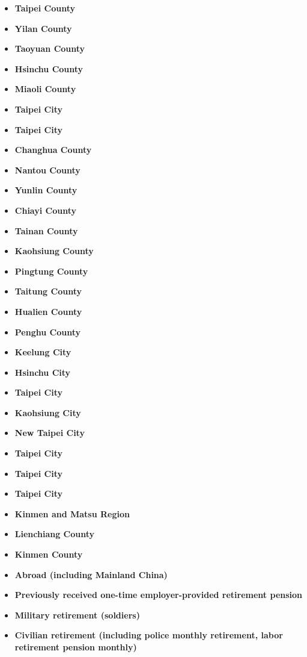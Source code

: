 \documentclass[twocolumn]{article}
\begin{document}
\begin{itemize}
    \item \textbf{Taipei County}
    \item \textbf{Yilan County}
    \item \textbf{Taoyuan County}
    \item \textbf{Hsinchu County}
    \item \textbf{Miaoli County}
    \item \textbf{Taipei City}
    \item \textbf{Taipei City}
    \item \textbf{Changhua County}
    \item \textbf{Nantou County}
    \item \textbf{Yunlin County}
    \item \textbf{Chiayi County}
    \item \textbf{Tainan County}
    \item \textbf{Kaohsiung County}
    \item \textbf{Pingtung County}
    \item \textbf{Taitung County}
    \item \textbf{Hualien County}
    \item \textbf{Penghu County}
    \item \textbf{Keelung City}
    \item \textbf{Hsinchu City}
    \item \textbf{Taipei City}
    \item \textbf{Kaohsiung City}
    \item \textbf{New Taipei City}
    \item \textbf{Taipei City}
    \item \textbf{Taipei City}
    \item \textbf{Taipei City}
    \item \textbf{Kinmen and Matsu Region}
    \item \textbf{Lienchiang County}
    \item \textbf{Kinmen County}
    \item \textbf{Abroad (including Mainland China)}
    \item \textbf{Previously received one-time employer-provided retirement pension}
    \item \textbf{Military retirement (soldiers)}
    \item \textbf{Civilian retirement (including police monthly retirement, labor retirement pension monthly)}
\end{itemize}
\end{document}

